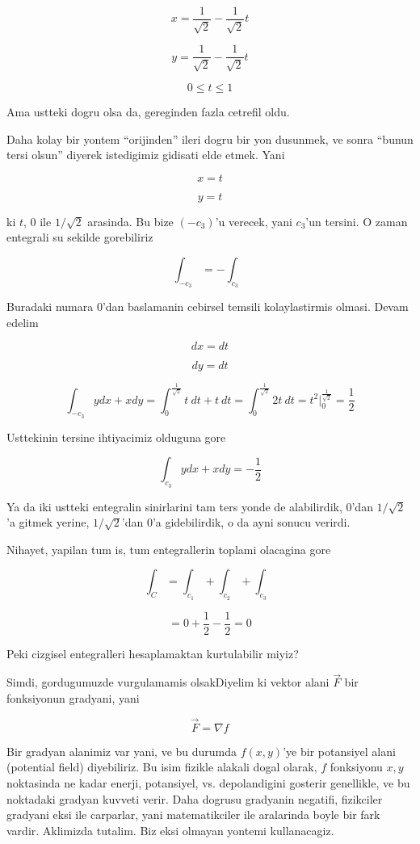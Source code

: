 \documentclass[12pt,fleqn]{article}\usepackage{../common}
\begin{document}
\[ x = \frac{1}{\sqrt{2}} - \frac{1}{\sqrt{2}} t \]

\[ y = \frac{1}{\sqrt{2}} - \frac{1}{\sqrt{2}} t \]

\[ 0 \le t \le 1 \]

Ama ustteki dogru olsa da, gereginden fazla cetrefil oldu. 

Daha kolay bir yontem ``orijinden'' ileri dogru bir yon dusunmek, ve sonra
``bunun tersi olsun'' diyerek istedigimiz gidisati elde etmek. Yani

\[ x = t \]

\[ y = t \]

ki $t$, 0 ile $1/\sqrt{2}$ arasinda. Bu bize $(-c_3)$'u verecek, yani
$c_3$'un tersini. O zaman entegrali su sekilde gorebiliriz

\[ \int_{-c_3} = - \int_{c_3}  \]

Buradaki numara 0'dan baslamanin cebirsel temsili kolaylastirmis
olmasi. Devam edelim

\[ dx = dt \]

\[ dy = dt \]

\[ \int_{-c_3} y dx + x dy  = 
\int_{0}^{\frac{1}{\sqrt{2}}} t \ dt + t \ dt = 
\int_{0}^{\frac{1}{\sqrt{2}}} 2t \ dt = 
t^2 \bigg|_{0}^{\frac{1}{\sqrt{2}}} =
\frac{1}{2}
\]

Usttekinin tersine ihtiyacimiz olduguna gore 

\[ \int_{c_3} y dx + x dy  = -\frac{1}{2}
\]


Ya da iki ustteki entegralin sinirlarini tam ters yonde de alabilirdik,
0'dan $1/\sqrt{2}$'a gitmek yerine, $1/\sqrt{2}$'dan 0'a gidebilirdik, o da
ayni sonucu verirdi. 

Nihayet, yapilan tum is, tum entegrallerin toplami olacagina gore

\[ \int_C = \int_{c_1} + \int_{c_2} + \int_{c_3}  \]

\[ = 0 + \frac{1}{2} - \frac{1}{2} = 0\]

Peki cizgisel entegralleri hesaplamaktan kurtulabilir miyiz? 

Simdi, gordugumuzde vurgulamamis olsakDiyelim ki vektor alani $\vec{F}$ bir
fonksiyonun gradyani, yani

\[ \vec{F}  = \nabla f\]

Bir gradyan alanimiz var yani, ve bu durumda $f(x,y)$'ye bir potansiyel
alani (potential field) diyebiliriz. Bu isim fizikle alakali dogal olarak,
$f$ fonksiyonu $x,y$ noktasinda ne kadar enerji, potansiyel,
vs. depolandigini gosterir genellikle, ve bu noktadaki gradyan kuvveti
verir. Daha dogrusu gradyanin negatifi, fizikciler gradyani eksi ile
carparlar, yani matematikciler ile aralarinda boyle bir fark
vardir. Aklimizda tutalim. Biz eksi olmayan yontemi kullanacagiz.
\end{document}
